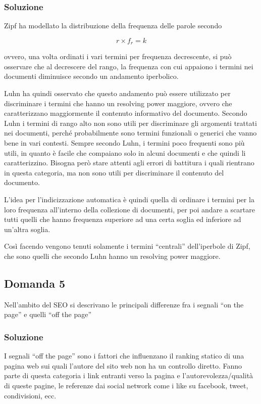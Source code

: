 \subsubsection{Soluzione}

Zipf ha modellato la distribuzione della frequenza delle parole secondo

$$
r \times f_r = k
$$

ovvero, una volta ordinati i vari termini per frequenza decrescente, si può osservare che al decrescere del rango, la frequenza con cui appaiono i termini nei documenti diminuisce secondo un andamento iperbolico.

Luhn ha quindi osservato che questo andamento può essere utilizzato per discriminare i termini che hanno un resolving power maggiore, ovvero che caratterizzano maggiormente il contenuto informativo del documento. Secondo Luhn i termini di rango alto non sono utili per discriminare gli argomenti trattati nei documenti, perché probabilmente sono termini funzionali o generici che vanno bene in vari contesti. Sempre secondo Luhn,  i termini poco frequenti sono più utili, in quanto è facile che compaiano solo in alcuni documenti e che quindi li caratterizzino. Bisogna però stare attenti agli errori di battitura i quali rientrano in questa categoria, ma non sono utili per discriminare il contenuto del documento.

L'idea per l'indicizzazione automatica è quindi quella di ordinare i termini per la loro frequenza all'interno della collezione di documenti, per poi andare a scartare tutti quelli che hanno frequenza superiore ad una certa soglia ed inferiore ad un'altra soglia.

Così facendo vengono tenuti solamente i termini ``centrali'' dell'iperbole di Zipf, che sono quelli che secondo Luhn hanno un resolving power maggiore. 

\subsection{Domanda 5}

Nell'ambito del SEO si descrivano le principali differenze fra i segnali ``on the page'' e quelli ``off the page''

\subsubsection{Soluzione}

I segnali ``off the page'' sono i fattori che influenzano il ranking statico di una pagina web sui quali l'autore del sito web non ha un controllo diretto. Fanno parte di questa categoria i link entranti verso la pagina e l'autorevolezza/qualità di queste pagine, le referenze dai social network come i like su facebook, tweet, condivisioni, ecc.

